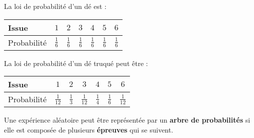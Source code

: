 \documentclass[
	classe=$2^{de}$
]{coursclass}
\begin{document}
\begin{exemple}
	\begin{multicols}{2}
		La loi de probabilité d'un dé est :
		\begin{center}
			\begin{tabular}{|l|c|c|c|c|c|c|}
				\hline
				Issue       & $1$           & $2$           & $3$           & $4$           & $5$           & $6$           \\ \hline
				Probabilité & $\frac{1}{6}$ & $\frac{1}{6}$ & $\frac{1}{6}$ & $\frac{1}{6}$ & $\frac{1}{6}$ & $\frac{1}{6}$ \\ \hline
			\end{tabular}
		\end{center}

		\columnbreak

		La loi de probabilité d'un dé truqué peut être :
		\begin{center}
			\begin{tabular}{|l|c|c|c|c|c|c|}
				\hline
				Issue       & $1$           & $2$           & $3$           & $4$           & $5$           & $6$           \\ \hline
				Probabilité & $\frac{1}{12}$ & $\frac{1}{3}$ & $\frac{1}{12}$ & $\frac{1}{4}$ & $\frac{1}{6}$ & $\frac{1}{12}$ \\ \hline
			\end{tabular}
		\end{center}
	\end{multicols}
\end{exemple}

\begin{definition}
	Une expérience aléatoire peut être représentée par un \textbf{arbre de probabilités} si elle est composée de plusieurs \textbf{épreuves} qui se suivent.
\end{definition}
\end{document}
